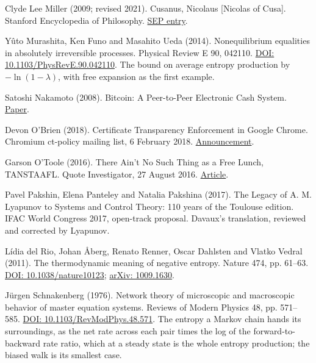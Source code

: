 \documentclass[11pt,twoside]{article}
\theoremstyle{thielethm}
\theoremstyle{thieledef}
\theoremstyle{thieledef}
\theoremstyle{thieledef}
\theoremstyle{thielethm}
\theoremstyle{thieleobs}
\theoremstyle{thielethm}
\begin{document}
\noindent Clyde Lee Miller (2009; revised 2021). Cusanus, Nicolaus [Nicolas of Cusa]. Stanford Encyclopedia of Philosophy. \href{https://plato.stanford.edu/entries/cusanus/}{SEP entry}.
\par\medskip

\noindent Y\^uto Murashita, Ken Funo and Masahito Ueda (2014). Nonequilibrium equalities in absolutely irreversible processes. Physical Review E 90, 042110. \href{https://doi.org/10.1103/PhysRevE.90.042110}{DOI: 10.1103/PhysRevE.90.042110}. The bound on average entropy production by $-\ln(1-\lambda)$, with free expansion as the first example.
\par\medskip

\noindent Satoshi Nakamoto (2008). Bitcoin: A Peer-to-Peer Electronic Cash System. \href{https://bitcoin.org/bitcoin.pdf}{Paper}.
\par\medskip

\noindent Devon O'Brien (2018). Certificate Transparency Enforcement in Google Chrome. Chromium ct-policy mailing list, 6 February 2018. \href{https://groups.google.com/a/chromium.org/g/ct-policy/c/wHILiYf31DE/m/iMFmpMEkAQAJ}{Announcement}.
\par\medskip

\noindent Garson O'Toole (2016). There Ain't No Such Thing as a Free Lunch, TANSTAAFL. Quote Investigator, 27 August 2016. \href{https://quoteinvestigator.com/2016/08/27/free-lunch/}{Article}.
\par\medskip

\noindent Pavel Pakshin, Elena Panteley and Natalia Pakshina (2017). The Legacy of A. M. Lyapunov to Systems and Control Theory: 110 years of the Toulouse edition. IFAC World Congress 2017, open-track proposal. Davaux's translation, reviewed and corrected by Lyapunov.
\par\medskip

\noindent Lídia del Rio, Johan Åberg, Renato Renner, Oscar Dahlsten and Vlatko Vedral (2011). The thermodynamic meaning of negative entropy. Nature 474, pp. 61--63. \href{https://doi.org/10.1038/nature10123}{DOI: 10.1038/nature10123}; \href{https://arxiv.org/abs/1009.1630}{arXiv: 1009.1630}.
\par\medskip

\noindent J\"urgen Schnakenberg (1976). Network theory of microscopic and macroscopic behavior of master equation systems. Reviews of Modern Physics 48, pp. 571--585. \href{https://doi.org/10.1103/RevModPhys.48.571}{DOI: 10.1103/RevModPhys.48.571}. The entropy a Markov chain hands its surroundings, as the net rate across each pair times the log of the forward-to-backward rate ratio, which at a steady state is the whole entropy production; the biased walk is its smallest case.
\par\medskip
\end{document}
